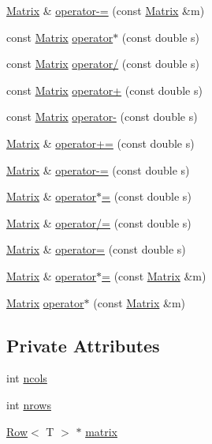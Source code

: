 \begin{DoxyCompactItemize}
\hyperlink{classMatrix}{Matrix} \& \hyperlink{classMatrix_a0e459fd035b2435ea016dc93c55ccac0}{operator-\/=} (const \hyperlink{classMatrix}{Matrix} \&m)
\item 
const \hyperlink{classMatrix}{Matrix} \hyperlink{classMatrix_ac4e94b307c56a15fb47a9255855f94a9}{operator$\ast$} (const double s)
\item 
const \hyperlink{classMatrix}{Matrix} \hyperlink{classMatrix_a2525c0e0feb231dd01fb6ae96aa53dac}{operator/} (const double s)
\item 
const \hyperlink{classMatrix}{Matrix} \hyperlink{classMatrix_a3c70791a9bb45afff8d0ea23601e3203}{operator+} (const double s)
\item 
const \hyperlink{classMatrix}{Matrix} \hyperlink{classMatrix_a254817e151d338279aec5711b6cdf403}{operator-\/} (const double s)
\item 
\hyperlink{classMatrix}{Matrix} \& \hyperlink{classMatrix_a54d2f788e4e209cfe472bbcbbbd6bc2d}{operator+=} (const double s)
\item 
\hyperlink{classMatrix}{Matrix} \& \hyperlink{classMatrix_ad513d4073587eab0cee247875b6c860a}{operator-\/=} (const double s)
\item 
\hyperlink{classMatrix}{Matrix} \& \hyperlink{classMatrix_a8079792abad8b038cd795a339ce9747b}{operator$\ast$=} (const double s)
\item 
\hyperlink{classMatrix}{Matrix} \& \hyperlink{classMatrix_ad1acebe419756785acef046796fb6060}{operator/=} (const double s)
\item 
\hyperlink{classMatrix}{Matrix} \& \hyperlink{classMatrix_a9bea17f8319e2e2064fd85700e46d2fb}{operator=} (const double s)
\item 
\hyperlink{classMatrix}{Matrix} \& \hyperlink{classMatrix_a3226c4b1a3ffb1090a7434806ad2ef03}{operator$\ast$=} (const \hyperlink{classMatrix}{Matrix} \&m)
\item 
\hyperlink{classMatrix}{Matrix} \hyperlink{classMatrix_ae9307b29ba230013f0fce5ebf8e7fecd}{operator$\ast$} (const \hyperlink{classMatrix}{Matrix} \&m)
\end{DoxyCompactItemize}
\subsection*{Private Attributes}
\begin{DoxyCompactItemize}
\item 
int \hyperlink{classMatrix_a30b634d02c22a903661761ef74189ae0}{ncols}
\item 
int \hyperlink{classMatrix_adaa4451e47cf953a563db25d155acbcc}{nrows}
\item 
\hyperlink{classRow}{Row}$<$ T $>$ $\ast$ \hyperlink{classMatrix_a433500d09b0f8495dcc2c86ee9224508}{matrix}
\end{DoxyCompactItemize}
